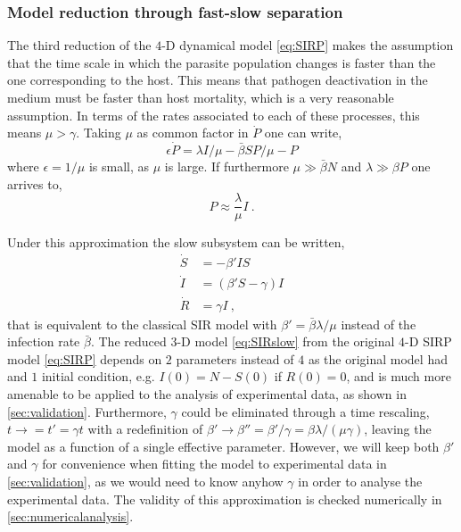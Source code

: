 \subsubsection{Model reduction through fast-slow separation}
\label{sec:fastslow}

The third reduction of the $4$-D dynamical model \cref{eq:SIRP} makes the
assumption that the time scale in which the parasite population changes is
faster than the one corresponding to the host. This means that pathogen
deactivation in the medium must be faster than host mortality, which is a very
reasonable assumption. In terms of the rates associated to
each of these processes, this means $\mu>\gamma$. Taking $\mu$ as common factor
in $\dot{P}$ one can write,
\begin{equation}
    \epsilon \dot{P} =\lambda I/\mu-\bar{\beta}SP/\mu-P
\end{equation}
where $\epsilon=1/\mu$ is small, as $\mu$ is large. If furthermore
$\mu\gg\bar{\beta}N$ and  $\lambda\gg \beta P$ one arrives to,
\begin{equation}\label{eq:P_approx}
    P\approx \frac{\lambda}{\mu} I \ .
\end{equation}

Under this approximation the slow subsystem can be written,
\begin{equation}\label{eq:SIRslow}
    \begin{aligned}
        \dot{S} & =-\beta' I S         \\
        \dot{I} & =(\beta' S-\gamma) I \\
        \dot{R} & =\gamma I\ ,
    \end{aligned}
\end{equation}
that is equivalent to the classical SIR model with $\beta'=\bar{\beta}
    \lambda/\mu$ instead of the infection rate $\bar{\beta}$. The reduced $3$-D
model \cref{eq:SIRslow} from the original $4$-D SIRP model \cref{eq:SIRP}
depends on $2$ parameters instead of $4$ as the original model had and $1$
initial condition, e.g. $I(0)=N-S(0)$ if $R(0)=0$, and is much more amenable to
be applied to the analysis of experimental data, as shown in
\cref{sec:validation}.
Furthermore, $\gamma$ could be eliminated through a time rescaling,
$t\rightarrow=t'=\gamma t$ with a redefinition of
$\beta'\rightarrow\beta''=\beta'/\gamma=\beta\lambda/(\mu\gamma)$, leaving the
model as a function of a single effective parameter. However, we will keep both
$\beta'$ and $\gamma$ for convenience when fitting the model to experimental
data in \cref{sec:validation}, as we would need to know anyhow $\gamma$ in
order to analyse the experimental data. The validity of this approximation is
checked numerically in \cref{sec:numericalanalysis}.


